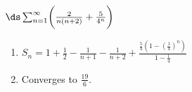 {$\ds \sum_{n=1}^\infty \biggl(\frac{2}{n(n+2)} +\frac{5}{4^n}\biggr)$
}
{\begin{enumerate}
\item		$S_n=1+\frac12-\frac{1}{n+1}-\frac{1}{n+2}+\frac{\frac54(1-(\frac14)^n)}{1-\frac14}$
\item		Converges to $\frac{19}{6}$.
\end{enumerate}
}